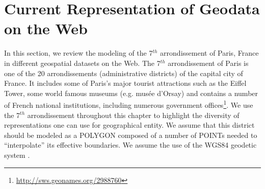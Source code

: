\section{Current Representation of Geodata on the Web}\label{sec:scenario}
In this section, we review the modeling of the 7$^{th}$ arrondissement of Paris, France in different geospatial datasets on the Web. The 7$^{th}$ arrondissement of Paris is one of the 20 arrondissements (administrative districts) of the capital city of France. It includes some of Paris's major tourist attractions such as the Eiffel Tower, some world famous museums (e.g. mus\'{e}e d'Orsay) and contains a number of French national institutions, including numerous government offices\footnote{\url{http://sws.geonames.org/2988760}}. We use the 7$^{th}$ arrondissement throughout this chapter to highlight the diversity of representations one can use for  geographical entity. We assume that this district should be modeled as a POLYGON composed of a number of POINTs needed to ``interpolate'' its effective boundaries. We assume the use of the WGS84 geodetic system \cite{wgs84ref}.

\begin{table}[!htbp]
\end{table}

